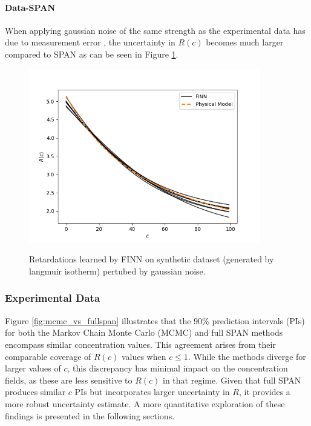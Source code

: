\documentclass{article}
\begin{document}
\paragraph{Data-SPAN}
When applying gaussian noise of the same strength as the experimental data has due to measurement error \cite{nowak2016entropy}, the uncertainty in $R(c)$ becomes much larger compared to SPAN as can be seen in Figure \ref{fig:synthetic_langmuir_c_noise}.

\begin{figure}
    \centering
    \includegraphics[width=0.9\textwidth]{figs/finn_synthetic_langmuir_c_noise.png}
    \label{fig:synthetic_langmuir_c_noise}
    \caption{Retardations learned by FINN on synthetic dataset (generated by langmuir isotherm) pertubed by gaussian noise.}
\end{figure}



\subsubsection{Experimental Data}

Figure \ref{fig:mcmc_vs_fullspan} illustrates that the 90\% prediction intervals (PIs) for both the Markov Chain Monte Carlo (MCMC) and full SPAN methods encompass similar concentration values. This agreement arises from their comparable coverage of $R(c)$ values when $c \leq 1$. While the methods diverge for larger values of $c$, this discrepancy has minimal impact on the concentration fields, as these are less sensitive to $R(c)$ in that regime. Given that full SPAN produces similar $c$ PIs but incorporates larger uncertainty in $R$, it provides a more robust uncertainty estimate. A more quantitative exploration of these findings is presented in the following sections.
\end{document}
